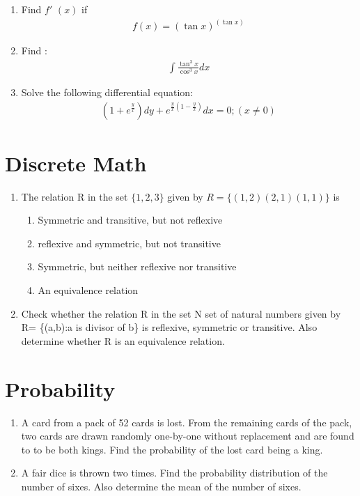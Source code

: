 \documentclass[journal,12pt,twocolumn]{IEEEtran}
\renewcommand\thesection{\arabic{section}}
\begin{document}
\begin{enumerate}[label=\thesection.\arabic*.,ref=\thesection.\theenumi]
\item Find $f'$ $\left(x\right)$ if \begin{align} f\left(x\right)=\left(\tan x\right)^{\left(\tan x\right)} \nonumber \end{align}

\item Find :\begin{align} \int \frac{\tan^3x}{\cos^3x} dx \nonumber \end{align} 



\item Solve the following differential equation: \begin{align} (1+e^{\frac{y}{x}}) dy+e^{\frac{y}{x}(1-\frac{y}{x})} dx = 0 ; (x\not= 0) \nonumber \end{align}


\end{enumerate}
 \section{Discrete Math }
\begin{enumerate}
\item  The relation R in the set $ \{1,2,3\}$  given by $R=\{(1,2)(2,1)(1,1)\}$ is

\begin{enumerate}
    \item Symmetric and transitive, but not reflexive  \\
    \item reflexive and symmetric, but not transitive  \\
    \item Symmetric, but neither reflexive nor transitive \\
    \item An equivalence relation 
\end{enumerate}
  \item Check whether the relation R in the set N set of natural numbers given by R= \{(a,b):a is divisor of b\} is reflexive, symmetric or transitive. Also determine whether R is an equivalence relation. 
\end{enumerate}
 \section{Probability}
\begin{enumerate}
\item A card from a pack of 52 cards is lost. From the remaining cards of the pack, two cards are drawn randomly one-by-one without replacement and are found to to be both kings. Find the probability of the lost card being a king.\\

\item A fair dice is thrown two times. Find the probability distribution of the number of sixes. Also determine the mean of the number of sixes.\\

\end{enumerate}
\end{document}
